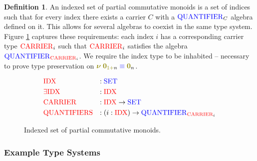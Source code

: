 \documentclass[a4paper,UKenglish,cleveref, autoref, thm-restate,authorcolumns]{lipics-v2019}
\theoremstyle{definition}
\newtheorem{nidefinition}[theorem]{Definition}
\newcommand{\type}[1]{\textcolor{blue}{\operatorname{#1}}}
\newcommand{\constr}[1]{\textcolor{olive}{\operatorname{#1}}}
\newcommand{\field}[1]{\textcolor{red}{\operatorname{#1}}}
\newcommand{\PO}{\constr{\mathbf{0}}}
\newcommand{\new}{\constr{\boldsymbol{\nu}} \;}
\newcommand{\suc}{\constr{\scriptstyle 1+}}
\newcommand{\Set}{\type{SET}}
\newcommand{\Quantifier}{\type{QUANTIFIER}}
\newcommand{\eqeq}{\; \type{\equiv} \;}
\begin{document}
\begin{nidefinition}
  An indexed set of partial commutative monoids is a set of indices such that for every index there exists a carrier $C$ with a $\Quantifier_C$ algebra defined on it.
  This allows for several algebras to coexist in the same type system.
  Figure \ref{fig:indexed-multiplicities} captures these requirements: each index $i$ has a corresponding carrier type $\field{CARRIER}_i$ such that $\field{CARRIER}_i$ satisfies the algebra $\Quantifier_{\field{CARRIER}_i}$.
  We require the index type to be inhabited -- necessary to prove type preservation on $\new \PO_{\suc n} \eqeq \PO_n$.
  
  \begin{figure}[h]
  \begin{equation}
  \begin{split}
    &\field{IDX}          &:{} &\Set \\
    &\field{\exists IDX}  &:{} &\field{IDX} \\
    &\field{CARRIER}      &:{} &\field{IDX} \to \Set \\
    &\field{QUANTIFIERS}  &:{} &(i : \field{IDX}) \to \Quantifier_{\field{CARRIER}_i}
  \end{split}
  \end{equation}
  \caption{Indexed set of partial commutative monoids.}
  \label{fig:indexed-multiplicities}
  \end{figure}
\end{nidefinition}

\subsubsection{Example Type Systems}

\end{document}
